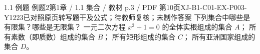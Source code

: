 \par\noindent\begin{minipage}{\linewidth}
\begin{bankitem}{1.1 例题 例题2}{第1章 / 1.1 集合 / 教材 p.3 / PDF 第10页}{XJ-B1-C01-EX-P003-Y1223}{已对照原页转写题干及公式；待教师复核；未制作答案}
下列集合中哪些是有限集？哪些是无限集？
一元二次方程 $x^2+1=0$ 的全体实根组成的集合 $A$；
所有素数（即质数）组成的集合 $B$；
所有矩形组成的集合 $C$；
所有亚洲国家组成的集合 $D$。
\end{bankitem}
\end{minipage}\par\medskip
